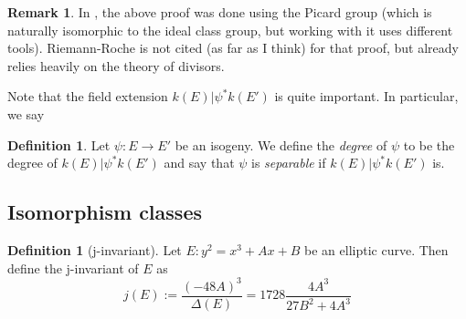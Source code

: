 \documentclass{scrartcl}
\theoremstyle{definition}
\newtheorem{definition}[prop]{Definition}
\newtheorem{remark}[prop]{Remark}
\begin{document}
\begin{remark}
    In \cite{EllipticCurves}, the above proof was done using the Picard group (which is naturally isomorphic to the ideal class group, but working with it uses different tools).
    Riemann-Roche is not cited (as far as I think) for that proof, but already relies heavily on the theory of divisors.
\end{remark}

Note that the field extension $k(E) | \psi^*k(E')$ is quite important.
In particular, we say
\begin{definition}
    Let $\psi: E \to E'$ be an isogeny.
    We define the \emph{degree} of $\psi$ to be the degree of $k(E) | \psi^*k(E')$ and say that $\psi$ is \emph{separable} if $k(E) | \psi^*k(E')$ is.
\end{definition}

\subsection{Isomorphism classes}

\begin{definition}[j-invariant]
    Let $E: y^2 = x^3 + Ax + B$ be an elliptic curve.
    Then define the j-invariant of $E$ as
    \begin{equation*}
        j(E) := \frac {(-48 A)^3} {\Delta(E)} = 1728 \frac {4A^3} {27 B^2 + 4A^3}
    \end{equation*}
\end{definition}
\end{document}
